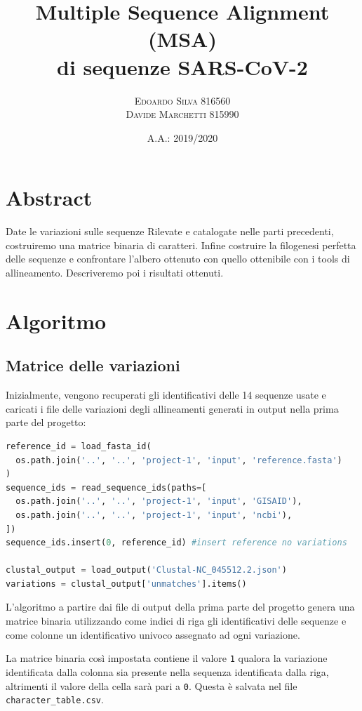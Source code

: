 \documentclass[11pt,italian]{article}
\title{Multiple Sequence Alignment (MSA) \\ di sequenze SARS-CoV-2}
\date{A.A.: 2019/2020}
\author{
    \textsc{Edoardo Silva} 816560 \\
    \textsc{Davide Marchetti} 815990
}
\begin{document}
\maketitle

\section{Abstract}

Date le variazioni sulle sequenze Rilevate e catalogate nelle parti precedenti, costruiremo una matrice binaria di caratteri.\newline
Infine costruire la filogenesi perfetta delle sequenze e confrontare l’albero ottenuto con quello ottenibile con i tools di allineamento. \newline
Descriveremo poi i risultati ottenuti.

\newpage
\section{Algoritmo}
\subsection{Matrice delle variazioni}
Inizialmente, vengono recuperati gli identificativi delle 14 sequenze usate e caricati i file delle variazioni degli allineamenti generati in output nella prima parte del progetto:

\begin{lstlisting}[language=Python,caption=Caricamento dei file necessari per l'elaborazione,label=code:read_input_files]
reference_id = load_fasta_id(
  os.path.join('..', '..', 'project-1', 'input', 'reference.fasta')
)
sequence_ids = read_sequence_ids(paths=[
  os.path.join('..', '..', 'project-1', 'input', 'GISAID'),
  os.path.join('..', '..', 'project-1', 'input', 'ncbi'),
])
sequence_ids.insert(0, reference_id) #insert reference no variations

clustal_output = load_output('Clustal-NC_045512.2.json')
variations = clustal_output['unmatches'].items()
\end{lstlisting}

\noindent
L'algoritmo a partire dai file di output della prima parte del progetto genera una matrice binaria utilizzando come indici di riga gli identificativi delle sequenze e come colonne un identificativo univoco assegnato ad ogni variazione.

La matrice binaria così impostata contiene il valore \lstinline{1} qualora la variazione identificata dalla colonna sia presente nella sequenza identificata dalla riga, altrimenti il valore della cella sarà pari a \lstinline{0}.
Questa è salvata nel file \lstinline{character_table.csv}.
\end{document}
